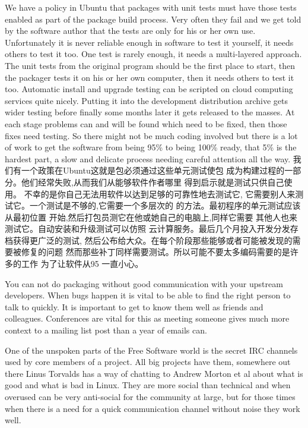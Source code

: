 We have a policy in Ubuntu that packages with unit tests must have those tests
enabled as part of the package build process. Very often they fail and we get
told by the software author that the tests are only for his or her own use.
Unfortunately it is never reliable enough in software to test it yourself, it
needs others to test it too. One test is rarely enough, it needs a multi-layered
approach. The unit tests from the original program should be the first place to
start, then the packager tests it on his or her own computer, then it needs
others to test it too. Automatic install and upgrade testing can be scripted on
cloud computing services quite nicely. Putting it into the development
distribution archive gets wider testing before finally some months later it gets
released to the masses. At each stage problems can and will be found which need
to be fixed, then those fixes need testing. So there might not be much coding
involved but there is a lot of work to get the software from being 95\% to being
100\% ready, that 5\% is the hardest part, a slow and delicate process needing
careful attention all the way.
我们有一个政策在Ubuntu这就是包必须通过这些单元测试使包
成为构建过程的一部分。他们经常失败,从而我们从能够软件作者哪里
得到启示就是测试只供自己使用。
不幸的是你自己无法用软件以达到足够的可靠性地去测试它,
它需要别人来测试它。一个测试是不够的,它需要一个多层次的
的方法。最初程序的单元测试应该从最初位置
开始,然后打包员测它在他或她自己的电脑上,同样它需要
其他人也来测试它。自动安装和升级测试可以仿照
云计算服务。最后几个月投入开发分发存档获得更广泛的测试,
然后公布给大众。在每个阶段那些能够或者可能被发现的需要被修复的问题
然而那些补丁同样需要测试。所以可能不要太多编码需要的是许多的工作
为了让软件从95%
一直小心。

You can not do packaging without good communication with your upstream
developers. When bugs happen it is vital to be able to find the right person to
talk to quickly. It is important to get to know them well as friends and
colleagues. Conferences are vital for this as meeting someone gives much more
context to a mailing list post than a year of emails can. 

One of the unspoken parts of the Free Software world is the secret IRC channels
used by core members of a project. All big projects have them, somewhere out
there Linus Torvalds has a way of chatting to Andrew Morton et al about what is
good and what is bad in Linux. They are more social than technical and when
overused can be very anti-social for the community at large, but for those times
when there is a need for a quick communication channel without noise they work
well.

